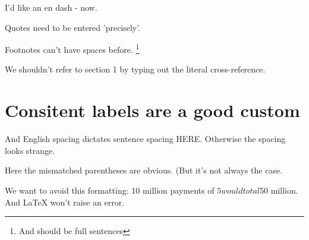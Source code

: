 \documentclass{article}
\begin{document}
I'd like an en dash - now.

Quotes need to be entered 'precisely'.

Footnotes can't have spaces before. \footnote{And should be full sentences}

We shouldn't refer to section 1 by typing out the literal cross-reference.

\section{Consitent labels are a good custom}\label{good-customs}

And English spacing dictates sentence spacing HERE. Otherwise the spacing looks strange.

Here the mismatched parentheses are obvious. (But it's not always the case.

We want to avoid this formatting: 10 million payments of $5 would total $50 million. 
And \LaTeX{} won't raise an error.
\end{document}
